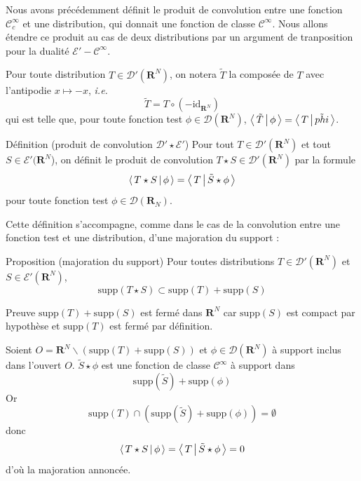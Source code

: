         Nous avons précédemment définit le produit de convolution entre une fonction $\mathcal{C}_c^{\infty}$ et une distribution, qui donnait une fonction de classe $\mathcal{C}^{\infty}$. Nous allons étendre ce produit au cas de deux distributions par un argument de tranposition pour la dualité $\mathcal{E}'-\mathcal{C}^{\infty}$.

        Pour toute distribution $T \in \mathcal{D}'(\mathbf{R}^N)$, on notera $\tilde{T}$ la composée de $T$ avec l’antipodie $x \mapsto -x$, \textit{i.e.}
        \[ \tilde{T} = T \circ (-\text{id}_{\mathbf{R}^N}) \]   
        qui est telle que, pour toute fonction test $\phi \in \mathcal{D}(\mathbf{R}^N)$, $\left< \, \tilde{T} \, \middle| \, \phi \, \right> = \left< \, T \, \middle| \, \tilde{phi} \, \right>$.

        \begin{omed}{Définition (produit de convolution $\mathcal{D}' \star \mathcal{E}'$)}
            Pour tout $T \in \mathcal{D}'(\mathbf{R}^N)$ et tout $S \in \mathcal{E}'(\mathbf{R}^N$), on définit le produit de convolution $T \star S \in \mathcal{D}'(\mathbf{R}^N)$ par la formule 
            \[ \left< \, T \star S \, \middle| \, \phi \, \right> = \left< \, T \, \middle| \, \tilde{S} \star \phi \, \right> \]   
            pour toute fonction test $\phi \in \mathcal{D}(\mathbf{R}_N)$.
        \end{omed}

        Cette définition s’accompagne, comme dans le cas de la convolution entre une fonction test et une distribution, d’une majoration du support :

        \begin{omed}{Proposition (majoration du support)}
            Pour toutes distributions $T \in \mathcal{D}'(\mathbf{R}^N)$ et $S \in \mathcal{E}'(\mathbf{R}^N)$, 
            \[ \text{supp}(T \star S) \subset \text{supp}(T) + \text{supp}(S) \]  
        \end{omed}

        \begin{demo}{Preuve}
            $\text{supp}(T) + \text{supp}(S)$ est fermé dans $\mathbf{R}^N$ car $\text{supp}(S)$ est compact par hypothèse et $\text{supp}(T)$ est fermé par définition.

            Soient $O = \mathbf{R}^N \backslash (\text{supp}(T) + \text{supp}(S))$ et $\phi \in \mathcal{D}(\mathbf{R}^N)$ à support inclus dans l’ouvert $O$. $\tilde{S} \star \phi$ est une fonction de classe $\mathcal{C}^{\infty}$ à support dans 
            \[ \text{supp}(\tilde{S}) + \text{supp}(\phi) \]    
            Or 
            \[ \text{supp}(T) \cap \left(\text{supp}(\tilde{S}) + \text{supp}(\phi)\right) = \emptyset \]   
            donc 
            \[ \left< \, T \star S \, \middle| \, \phi \, \right> = \left< \, T \, \middle| \, \tilde{S} \star \phi \, \right> = 0 \]   
            d’où la majoration annoncée.
        \end{demo}

